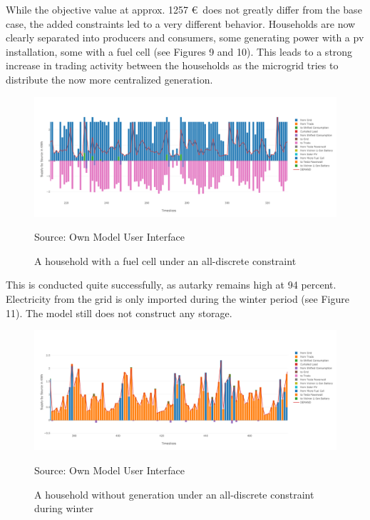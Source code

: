 \documentclass[
	11pt,								%
	DIV10,								%
	a4paper,         					%
	oneside,							%
	headheight=20pt,					%
	footheight=20pt,					%
    parskip=full,						%
    listof=totoc,						%
	bibliography=totoc,					%
	index=totoc,						%
]{scrartcl}
\begin{document}
	While the objective value at approx. 1257 \euro\ does not greatly differ from the base case, the added constraints led to a very different behavior. Households are now clearly separated into producers and consumers, some generating power with a pv installation, some with a fuel cell (see Figures 9 and 10). This leads to a strong increase in trading activity between the households as the microgrid tries to distribute the now more centralized generation.
	
\begin{figure}[H]
	\centering
	\includegraphics[width=1\textwidth]{pictures/RES_8_DISC.png}
	\caption{A household with a fuel cell under an all-discrete constraint}
	\label{commercial_dispatch_base}
	\flushleft\quad\quad\footnotesize{Source: Own Model User Interface}
\end{figure}	
This is conducted quite successfully, as autarky remains high at 94 percent. Electricity from the grid is only imported during the winter period (see Figure 11). The model still does not construct any storage.

\begin{figure}[H]
	\centering
	\includegraphics[width=1\textwidth]{pictures/RES_6_DISC.png}
	\caption{A household without generation under an all-discrete constraint during winter}
	\label{commercial_dispatch_base}
	\flushleft\quad\quad\footnotesize{Source: Own Model User Interface}
\end{figure}	
\end{document}
